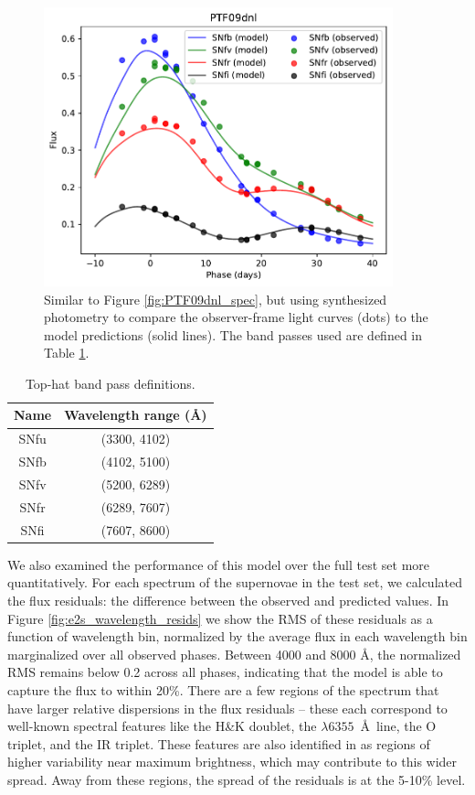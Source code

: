 \begin{figure}
    \centering
    \includegraphics[width=0.9\textwidth]{figures/nn_twins/PTF09dnl_lc.pdf}
    \caption{Similar to Figure \ref{fig:PTF09dnl_spec}, but using synthesized photometry to compare the observer-frame light curves (dots) to the model predictions (solid lines). The band passes used are defined in Table \ref{tab:snf_tophats}.}
    \label{fig:PTF09dnl_lc}
\end{figure}

\begin{table}[htpb]
    \centering
    \begin{tabular}{cc}\toprule
        Name & Wavelength range (\AA) \\\midrule
        SNfu & (3300, 4102)\\
        SNfb & (4102, 5100)\\
        SNfv & (5200, 6289)\\
        SNfr & (6289, 7607)\\
        SNfi & (7607, 8600)\\\bottomrule
    \end{tabular}
    \caption{Top-hat band pass definitions.}
    \label{tab:snf_tophats}
\end{table}

We also examined the performance of this model over the full test set more quantitatively. For each spectrum of the supernovae in the test set, we calculated the flux residuals: the difference between the observed and predicted values. In Figure \ref{fig:e2s_wavelength_resids} we show the RMS of these residuals as a function of wavelength bin, normalized by the average flux in each wavelength bin marginalized over all observed phases. Between 4000 and 8000 \AA, the normalized RMS remains below 0.2 across all phases, indicating that the model is able to capture the flux to within 20\%. There are a few regions of the spectrum that have larger relative dispersions in the flux residuals -- these each correspond to well-known spectral features like the  H\&K doublet, the  $\lambda 6355$~\AA\ line, the O triplet, and the  IR triplet. These features are also identified in  as regions of higher variability near maximum brightness, which may contribute to this wider spread. Away from these regions, the spread of the residuals is at the 5-10\% level.

